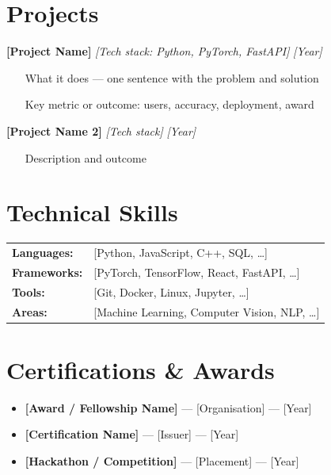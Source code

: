 \documentclass[11pt, a4paper]{article}
\newcommand{\cvproject}[3]{%
  \textbf{#1} \quad \textit{#2} \hfill \textit{#3} \\
}
\begin{document}
\vspace{4pt}

\section{Projects}

\cvproject{[Project Name]}{[Tech stack: Python, PyTorch, FastAPI]}{[Year]}
\begin{itemize}
  \item [What it does — one sentence with the problem and solution]
  \item [Key metric or outcome: users, accuracy, deployment, award]
\end{itemize}

\vspace{4pt}

\cvproject{[Project Name 2]}{[Tech stack]}{[Year]}
\begin{itemize}
  \item [Description and outcome]
\end{itemize}

\vspace{4pt}

\section{Technical Skills}

\begin{tabular}{@{}ll}
  \textbf{Languages:}   & [Python, JavaScript, C++, SQL, \ldots] \\
  \textbf{Frameworks:}  & [PyTorch, TensorFlow, React, FastAPI, \ldots] \\
  \textbf{Tools:}       & [Git, Docker, Linux, Jupyter, \ldots] \\
  \textbf{Areas:}       & [Machine Learning, Computer Vision, NLP, \ldots] \\
\end{tabular}

\vspace{4pt}

\section{Certifications \& Awards}

\begin{itemize}
  \item \textbf{[Award / Fellowship Name]} — [Organisation] — [Year]
  \item \textbf{[Certification Name]} — [Issuer] — [Year]
  \item \textbf{[Hackathon / Competition]} — [Placement] — [Year]
\end{itemize}
\end{document}
